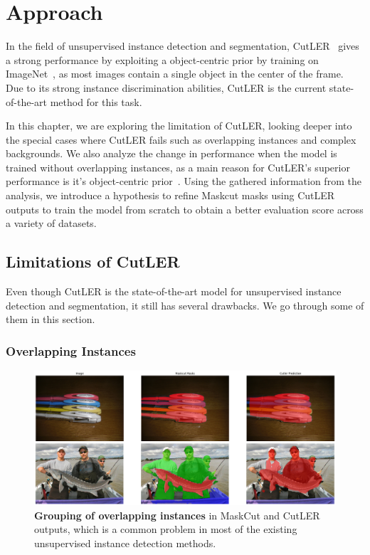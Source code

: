 \chapter{Approach}\label{chap:approach}

In the field of unsupervised instance detection and segmentation, CutLER~\cite{wang2023cut} gives a strong performance by exploiting a  object-centric prior by training on ImageNet~\cite{deng2009imagenet}, as most images contain a single
object in the center of the frame.  Due to its strong instance discrimination abilities, CutLER is the current state-of-the-art method for this task.

In this chapter, we are exploring the limitation of CutLER, looking deeper into the special cases where CutLER fails such as overlapping instances and complex backgrounds. We also analyze the change in performance when the model is trained without overlapping instances, as a main reason for CutLER's superior  performance is it's object-centric prior~\cite{engstler2023understanding}. Using the gathered information from the analysis, we introduce a hypothesis to refine Maskcut masks using CutLER outputs to train the model from scratch to obtain a better evaluation score across a variety of datasets.

\section{Limitations of CutLER}
Even though CutLER is the state-of-the-art model for unsupervised instance detection and segmentation, it still has several drawbacks. We go through some of them in this section.

\subsection{Overlapping Instances}
\begin{figure}
	\centering
	\includegraphics[width=1\textwidth]{Images/main/cutler-prob-overlap.png}
	\caption[\textbf{Cutler's Performance on Images with Overlapping Instances}]{\textbf{Grouping of overlapping instances} in MaskCut and CutLER outputs, which is a common problem in most of the existing unsupervised instance detection methods.}
	\label{fig:cutler_overlapping_instances_eg}
\end{figure}

